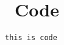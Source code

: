 \chapter{\ Code}

\begin{lstlisting}[language=PythonPlus, style=colored]
this is code
\end{lstlisting}

